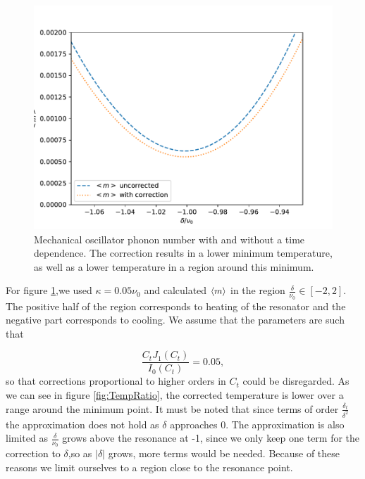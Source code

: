 \documentclass[reprint, amsmath,amssymb, aps,pra]{revtex4-1}
\begin{document}
\begin{figure}[h!]
\includegraphics[scale=.5]{TempGorden1.pdf}   
\caption{ Mechanical oscillator phonon number with and without a time dependence. The correction results in a lower minimum temperature, as well as a lower temperature in a region around this minimum.}\label{fig:TempComparisson}
\end{figure}

For figure \ref{fig:TempComparisson},we used $\kappa = 0.05\nu_0$ and calculated $\expval{m}$ in the region $\frac{\delta}{\nu_0}\in [-2,2]$. The positive half of the region corresponds to heating of the resonator and the negative part corresponds to cooling. We assume that the parameters are such that

\begin{equation}
\frac{C_tJ_1(C_t)}{I_0(C_t)} = 0.05,
\end{equation} so that corrections proportional to higher orders in $C_t$ could be disregarded.  As we can see in figure \ref{fig:TempRatio}, the corrected temperature is lower over a range around the minimum point. It must be noted that since terms of order $\frac{\delta_t}{\delta^2}$ the approximation does not hold as $\delta$ approaches 0. The approximation is also limited as $\frac{\delta}{\nu_0}$ grows above the resonance at -1, since we only keep one term for the correction to $\delta$,so as $|\delta|$ grows, more terms would be needed. Because of these reasons we limit ourselves to a region close to the resonance point. 
\end{document}
